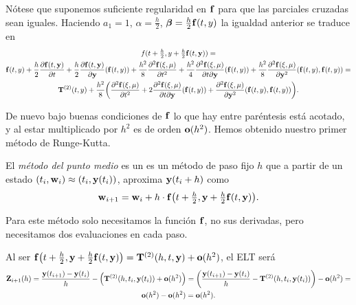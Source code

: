 Nótese que suponemos suficiente regularidad en $\vb{f}{}$
para que las parciales cruzadas sean iguales.
Haciendo $a_1 = 1$, $\alpha = \frac{h}{2}$, $\vb*{\beta} = \frac{h}{2} \vb{f}{}(t,y)$
la igualdad anterior se traduce en
\begin{multline*}
    f(t + \tfrac{h}{2}, y + \tfrac{h}{2}\vb{f}{}(t, \vb{y}{})) = \\
    \vb{f}{}(t,y) +
        \frac{h}{2}\pdv{\vb{f}{}(t, \vb{y}{})}{t} +
        \frac{h}{2}\pdv{\vb{f}{}(t, \vb{y}{})}{\vb{y}{}} \qty(\vb{f}{}(t, y)) +
        \frac{h^2}{8}\pdv[2]{\vb{f}{}(\xi, \mu)}{t} +
        \frac{h^2}{4}\pdv{\vb{f}{}(\xi, \mu)}{t}{\vb{y}{}} \qty(\vb{f}{}(t, y)) +
        \frac{h^2}{8}\pdv[2]{\vb{f}{}(\xi, \mu)}{\vb{y}{}} \qty(\vb{f}{}(t, y), \vb{f}{}(t, y)) = \\
    \vb{T}^{(2)}(t, y) + \frac{h^2}{8}\qty(
        \pdv[2]{\vb{f}{}(\xi, \mu)}{t} +
        2\pdv{\vb{f}{}(\xi, \mu)}{t}{\vb{y}{}} \qty(\vb{f}{}(t, y)) +
        \pdv[2]{\vb{f}{}(\xi, \mu)}{\vb{y}{}} \qty(\vb{f}{}(t, y), \vb{f}{}(t, y))
    ).
\end{multline*}

De nuevo bajo buenas condiciones de $\vb{f}{}$
lo que hay entre paréntesis está acotado,
y al estar multiplicado por $h^2$ es de orden $\vb{o}{}(h^2)$.
Hemos obtenido nuestro primer método de Runge-Kutta.

\begin{method}\label{met:mean-point}
    El \emph{método del punto medio} es un es un método de paso fijo $h$ que
    a partir de un estado $(t_i, \vb{w}{}_i) \approx (t_i, \vb{y}{}(t_i))$,
    aproxima $\vb{y}{}(t_i + h)$ como
    \begin{equation*}
        \vb{w}{}_{i+1} = \vb{w}{}_i + h\cdot \vb{f}{}\qty(
            t + \tfrac{h}{2}, \vb{y}{} + \tfrac{h}{2}\vb{f}{}(t, \vb{y}{})
        ).
    \end{equation*}
\end{method}

\begin{remark}
    Para este método solo necesitamos la función $\vb{f}{}$, no sus derivadas,
    pero necesitamos dos evaluaciones en cada paso.
\end{remark}

\begin{remark}
    Al ser $\vb{f}{}\qty(t + \tfrac{h}{2}, \vb{y}{} + \tfrac{h}{2}\vb{f}{}(t, \vb{y}{})) =
    \vb{T}^{(2)}(h, t, \vb{y}{}) + \vb{o}{}(h^2)$,
    el ELT será
    \begin{multline*}
        \vb{Z}{}_{i+1}(h) =
        \frac{\vb{y}{}(t_{i+1}) - \vb{y}{}(t_i)}{h} - \qty(
            \vb{T}^{(2)}(h, t_i, \vb{y}{}(t_i)) + \vb{o}{}(h^2)
        ) =
        \qty(
            \frac{\vb{y}{}(t_{i+1}) - \vb{y}{}(t_i)}{h} - \vb{T}^{(2)}(h, t_i, \vb{y}{}(t_i))
        ) - \vb{o}{}(h^2) = \\
        \vb{o}{}(h^2) - \vb{o}{}(h^2) = \vb{o}{}(h^2).
    \end{multline*}
\end{remark}

